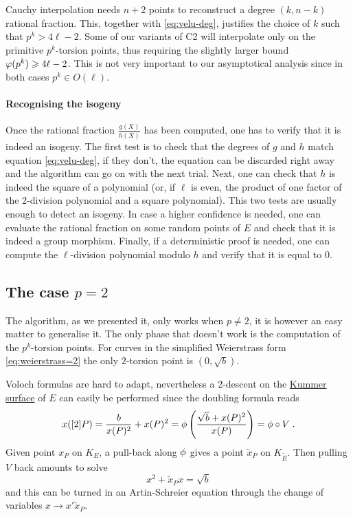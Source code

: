 Cauchy interpolation needs $n+2$ points to reconstruct a degree
$(k,n-k)$ rational fraction. This, together with \eqref{eq:velu-deg},
justifies the choice of $k$ such that $p^k > 4\ell - 2$. Some of our
variants of C2 will interpolate only on the primitive $p^k$-torsion
points, thus requiring the slightly larger bound $\varphi(p^k) \geqslant
4\ell - 2$. This is not very important to our asymptotical analysis
since in both cases $p^k \in O(\ell)$.

\paragraph{Recognising the isogeny}
Once the rational fraction $\frac{g(X)}{h(X)}$ has been computed, one
has to verify that it is indeed an isogeny. The first test is to check
that the degrees of $g$ and $h$ match equation \eqref{eq:velu-deg}, if
they don't, the equation can be discarded right away and the algorithm
can go on with the next trial. Next, one can check that $h$ is indeed
the square of a polynomial (or, if $\ell$ is even, the product of one
factor of the $2$-division polynomial and a square polynomial). This
two tests are usually enough to detect an isogeny. In case a higher
confidence is needed, one can evaluate the rational fraction on some
random points of $E$ and check that it is indeed a group
morphism. Finally, if a deterministic proof is needed, one can compute
the $\ell$-division polynomial modulo $h$ and verify that it is equal
to $0$.


\subsection{The case $p=2$}
\label{sec:p=2}
The algorithm, as we presented it, only works when $p\ne2$, it is
however an easy matter to generalise it. The only phase that doesn't
work is the computation of the $p^k$-torsion points. For curves in the
simplified Weierstrass form \eqref{eq:weierstrass=2} the only
$2$-torsion point is $(0,\sqrt{b})$.

Voloch formulas are hard to adapt, nevertheless a $2$-descent on the
\hyperref[def:kummer]{Kummer surface} of $E$ can easily be performed
since the doubling formula reads
\begin{equation}
  x([2]P) = \frac{b}{x(P)^2} + x(P)^2 =
  \phi\left(\frac{\sqrt{b} + x(P)^2}{x(P)} \right) = \phi\circ V
  \;\text{.}
\end{equation}
Given point $x_P$ on $K_E$, a pull-back along $\phi$ gives a
point $\tilde{x}_P$ on $K_{\widetilde{E}}$. Then pulling $V$ back
amounts to solve
\begin{equation}
  \label{eq:2-descent}
  x^2 + \tilde{x}_Px = \sqrt{b}
\end{equation}
and this can be turned in an Artin-Schreier equation through the
change of variables $x \rightarrow x'\tilde{x}_P$.

